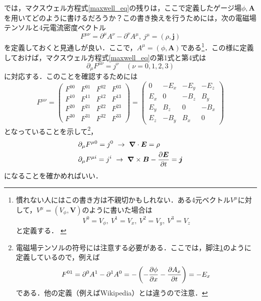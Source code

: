 \documentclass[a4paper,pdflatex,ja=standard]{bxjsarticle}
\begin{document}
では，マクスウェル方程式\eqref{maxwell_eq}の残りは，ここで定義したゲージ場$\phi,\bm{A}$を用いてどのように書けるだろうか？この書き換えを行うためには，次の電磁場テンソルと4元電流密度ベクトル
\begin{equation}
  F^{\mu\nu}
  =
  \partial^{\mu}A^{\nu}
  -
  \partial^{\nu}A^{\mu}
  ,\ 
  j^{\mu}
  =
  (\rho,\bm{j})
  \label{elemag_tensor}
\end{equation}
を定義しておくと見通しが良い．ここで，$A^{\mu}=(\phi,\bm{A})$である\footnote{
  慣れない人にはこの書き方は不親切かもしれない．ある4元ベクトル$V^{\mu}$に対して，$V^{\mu}=(V_{\phi},\bm{V})$のように書いた場合は
  $$
    V^{0}=V_{\phi}
    ,\ 
    V^{1}=V_x
    ,\ 
    V^{2}=V_y
    ,\ 
    V^{3}=V_z
  $$
  と定義する．
  \label{note4}
}．この様に定義しておけば，マクスウェル方程式\eqref{maxwell_eq}の第1式と第4式は
\begin{equation}
  \partial_{\mu}F^{\mu\nu}
  =
  j^{\nu}
  \quad
  (\nu=0,1,2,3)
  \label{maxwell_covariant}
\end{equation}
に対応する．このことを確認するためには
\begin{equation}
  F^{\mu\nu}
  =
  \begin{pmatrix}
    F^{00} & F^{01} & F^{02} & F^{03}  \\
    F^{10} & F^{11} & F^{12} & F^{13}  \\
    F^{20} & F^{21} & F^{22} & F^{23}  \\
    F^{30} & F^{31} & F^{32} & F^{33} 
  \end{pmatrix}
  =
  \begin{pmatrix}
    0 & -E_x & -E_y & -E_z \\
    E_{x} & 0 & -B_z & B_y \\
    E_{y} & B_z & 0 & -B_x \\
    E_{z} & -B_y & B_x & 0
  \end{pmatrix}
\end{equation}
となっていることを示して\footnote{
  電磁場テンソルの符号には注意する必要がある．ここでは，脚注\ref{note4}のように定義しているので，例えば
  $$
    F^{01}
    =
    \partial^{0}A^{1}
    -
    \partial^{1}A^{0}
    =
    -
    \left(  
      -
      \pdv{\phi}{x}
      -
      \pdv{A_x}{t}
    \right)
    =
    -E_x
  $$
  である．他の定義（例えばWikipedia）とは違うので注意．
}，
\begin{align}
  &
  \partial_{\mu}F^{\mu 0}=j^{0}
  \ 
  \rightarrow
  \ 
  \bm{\nabla}
  \cdot
  \bm{E}
  =
  \rho
  \\
  &
  \partial_{\mu}F^{\mu i}=j^{i}
  \ 
  \rightarrow
  \ 
  \bm{\nabla}\times\bm{B}
  -
  \pdv{\bm{E}}{t}
  =
  \bm{j}
\end{align}
になることを確かめればいい．
\end{document}
